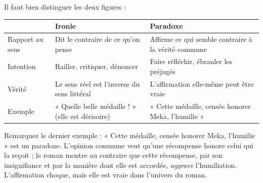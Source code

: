 \documentclass[11pt]{article}
\begin{document}
Il faut bien distinguer les deux figures :

\begin{center}
\begin{tabularx}{\linewidth}{|l|X|X|}
\hline
\rowcolor{popblueL} & \textbf{Ironie} & \textbf{Paradoxe} \\
\hline
Rapport au sens & Dit le contraire de ce qu'on pense & Affirme ce qui semble contraire à la vérité commune \\
\hline
Intention & Railler, critiquer, dénoncer & Faire réfléchir, ébranler les préjugés \\
\hline
Vérité & Le sens réel est l'inverse du sens littéral & L'affirmation elle-même peut être vraie \\
\hline
Exemple & « Quelle belle médaille ! » (elle est dérisoire) & « Cette médaille, censée honorer Meka, l'humilie » \\
\hline
\end{tabularx}
\end{center}

Remarquez le dernier exemple : « Cette médaille, censée honorer Meka, l'humilie » est un paradoxe. L'opinion commune veut qu'une récompense honore celui qui la reçoit ; le roman montre au contraire que cette récompense, par son insignifiance et par la manière dont elle est accordée, \emph{aggrave} l'humiliation. L'affirmation choque, mais elle est vraie dans l'univers du roman.
\end{document}
